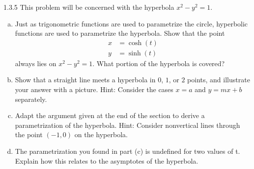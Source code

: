 \documentclass[twoside]{article}
\begin{document}
\begin{ejercicio}{1.3.5}
This problem will be concerned with the hyperbola $x^2 − y^2 = 1$.
\begin{enumerate}[a)]
\item Just as trigonometric functions are used to parametrize the circle, hyperbolic functions are used to parametrize the hyperbola. Show that the point
\begin{align*}
x&=\cosh(t)\\
y&=\sinh(t)
\end{align*}
always lies on $x^2 − y^2 = 1$. What portion of the hyperbola is covered?
\item Show that a straight line meets a hyperbola in $0$, $1$, or $2$ points, and illustrate your
answer with a picture. Hint: Consider the cases $x = a$ and $y = mx + b$ separately.
\item Adapt the argument given at the end of the section to derive a parametrization of the hyperbola. Hint: Consider nonvertical lines through the point $(−1, 0)$ on the hyperbola.
\item The parametrization you found in part (c) is undefined for two values of t. Explain how this relates to the asymptotes of the hyperbola.
\end{enumerate}
\end{ejercicio}
\end{document}
